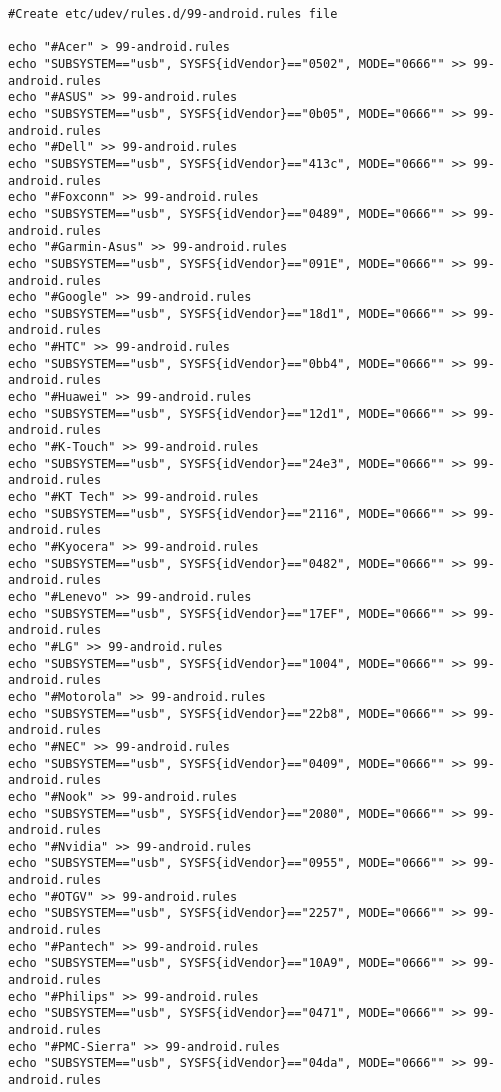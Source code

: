 \begin{maxipage}
\begin{verbatim}
#Create etc/udev/rules.d/99-android.rules file

echo "#Acer" > 99-android.rules
echo "SUBSYSTEM=="usb", SYSFS{idVendor}=="0502", MODE="0666"" >> 99-android.rules
echo "#ASUS" >> 99-android.rules
echo "SUBSYSTEM=="usb", SYSFS{idVendor}=="0b05", MODE="0666"" >> 99-android.rules
echo "#Dell" >> 99-android.rules
echo "SUBSYSTEM=="usb", SYSFS{idVendor}=="413c", MODE="0666"" >> 99-android.rules
echo "#Foxconn" >> 99-android.rules
echo "SUBSYSTEM=="usb", SYSFS{idVendor}=="0489", MODE="0666"" >> 99-android.rules
echo "#Garmin-Asus" >> 99-android.rules
echo "SUBSYSTEM=="usb", SYSFS{idVendor}=="091E", MODE="0666"" >> 99-android.rules
echo "#Google" >> 99-android.rules
echo "SUBSYSTEM=="usb", SYSFS{idVendor}=="18d1", MODE="0666"" >> 99-android.rules
echo "#HTC" >> 99-android.rules
echo "SUBSYSTEM=="usb", SYSFS{idVendor}=="0bb4", MODE="0666"" >> 99-android.rules
echo "#Huawei" >> 99-android.rules
echo "SUBSYSTEM=="usb", SYSFS{idVendor}=="12d1", MODE="0666"" >> 99-android.rules
echo "#K-Touch" >> 99-android.rules
echo "SUBSYSTEM=="usb", SYSFS{idVendor}=="24e3", MODE="0666"" >> 99-android.rules
echo "#KT Tech" >> 99-android.rules
echo "SUBSYSTEM=="usb", SYSFS{idVendor}=="2116", MODE="0666"" >> 99-android.rules
echo "#Kyocera" >> 99-android.rules
echo "SUBSYSTEM=="usb", SYSFS{idVendor}=="0482", MODE="0666"" >> 99-android.rules
echo "#Lenevo" >> 99-android.rules
echo "SUBSYSTEM=="usb", SYSFS{idVendor}=="17EF", MODE="0666"" >> 99-android.rules
echo "#LG" >> 99-android.rules
echo "SUBSYSTEM=="usb", SYSFS{idVendor}=="1004", MODE="0666"" >> 99-android.rules
echo "#Motorola" >> 99-android.rules
echo "SUBSYSTEM=="usb", SYSFS{idVendor}=="22b8", MODE="0666"" >> 99-android.rules
echo "#NEC" >> 99-android.rules
echo "SUBSYSTEM=="usb", SYSFS{idVendor}=="0409", MODE="0666"" >> 99-android.rules
echo "#Nook" >> 99-android.rules
echo "SUBSYSTEM=="usb", SYSFS{idVendor}=="2080", MODE="0666"" >> 99-android.rules
echo "#Nvidia" >> 99-android.rules
echo "SUBSYSTEM=="usb", SYSFS{idVendor}=="0955", MODE="0666"" >> 99-android.rules
echo "#OTGV" >> 99-android.rules
echo "SUBSYSTEM=="usb", SYSFS{idVendor}=="2257", MODE="0666"" >> 99-android.rules
echo "#Pantech" >> 99-android.rules
echo "SUBSYSTEM=="usb", SYSFS{idVendor}=="10A9", MODE="0666"" >> 99-android.rules
echo "#Philips" >> 99-android.rules
echo "SUBSYSTEM=="usb", SYSFS{idVendor}=="0471", MODE="0666"" >> 99-android.rules
echo "#PMC-Sierra" >> 99-android.rules
echo "SUBSYSTEM=="usb", SYSFS{idVendor}=="04da", MODE="0666"" >> 99-android.rules

\end{verbatim}
\end{maxipage}
